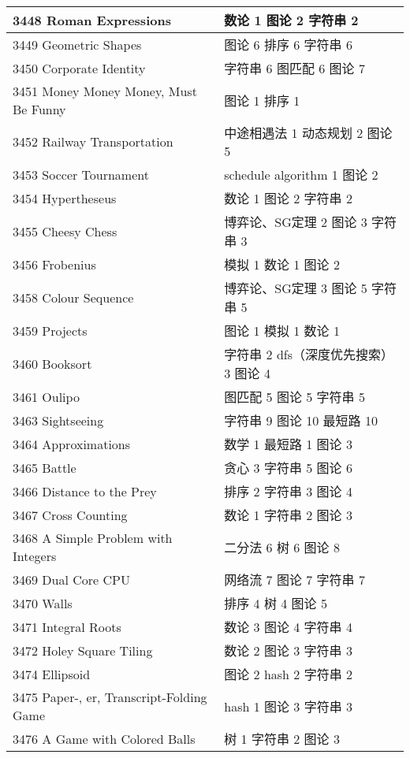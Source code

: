 \begin{longtable}{| p{} | p{} |}
 3448 Roman Expressions  & 数论 1 图论 2 字符串 2 \\ \hline
 3449 Geometric Shapes  & 图论 6 排序 6 字符串 6 \\ \hline
 3450 Corporate Identity  & 字符串 6 图匹配 6 图论 7 \\ \hline
 3451 Money Money Money, Must Be Funny  & 图论 1 排序 1 \\ \hline
 3452 Railway Transportation  & 中途相遇法 1 动态规划 2 图论 5 \\ \hline
 3453 Soccer Tournament  & schedule algorithm 1 图论 2 \\ \hline
 3454 Hypertheseus  & 数论 1 图论 2 字符串 2 \\ \hline
 3455 Cheesy Chess  & 博弈论、SG定理 2 图论 3 字符串 3 \\ \hline
 3456 Frobenius  & 模拟 1 数论 1 图论 2 \\ \hline
 3458 Colour Sequence  & 博弈论、SG定理 3 图论 5 字符串 5 \\ \hline
 3459 Projects  & 图论 1 模拟 1 数论 1 \\ \hline
 3460 Booksort  & 字符串 2 dfs（深度优先搜索） 3 图论 4 \\ \hline
 3461 Oulipo  & 图匹配 5 图论 5 字符串 5 \\ \hline
 3463 Sightseeing  & 字符串 9 图论 10 最短路 10 \\ \hline
 3464 Approximations  & 数学 1 最短路 1 图论 3 \\ \hline
 3465 Battle  & 贪心 3 字符串 5 图论 6 \\ \hline
 3466 Distance to the Prey  & 排序 2 字符串 3 图论 4 \\ \hline
 3467 Cross Counting  & 数论 1 字符串 2 图论 3 \\ \hline
 3468 A Simple Problem with Integers  & 二分法 6 树 6 图论 8 \\ \hline
 3469 Dual Core CPU  & 网络流 7 图论 7 字符串 7 \\ \hline
 3470 Walls  & 排序 4 树 4 图论 5 \\ \hline
 3471 Integral Roots  & 数论 3 图论 4 字符串 4 \\ \hline
 3472 Holey Square Tiling  & 数论 2 图论 3 字符串 3 \\ \hline
 3474 Ellipsoid  & 图论 2 hash 2 字符串 2 \\ \hline
 3475 Paper-, er, Transcript-Folding Game  & hash 1 图论 3 字符串 3 \\ \hline
 3476 A Game with Colored Balls  & 树 1 字符串 2 图论 3 \\ \hline

\end{longtable}
